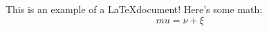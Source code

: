 \documentclass{article}
\begin{document}
This is an example of a \LaTeX document! Here's some math: $$mu = \nu + \xi$$
\end{document}
